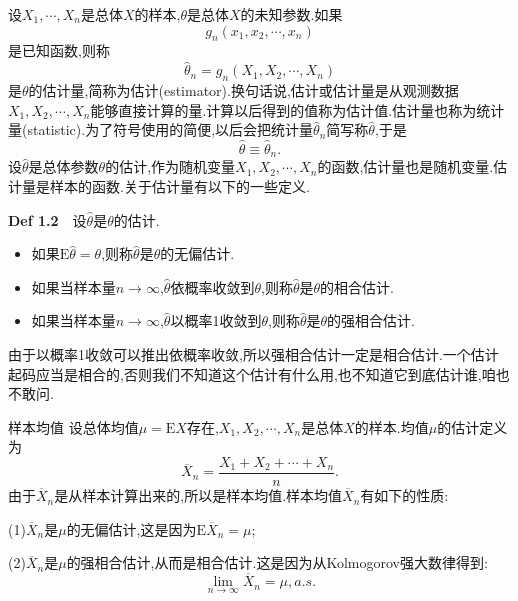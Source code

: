 	\begin{frame}
		设$X_1,\cdots,X_n$是总体$X$的样本,$\theta$是总体$X$的未知参数.如果
		\begin{equation}
			g_n(x_1,x_2,\cdots,x_n)
		\end{equation}
		是已知函数,则称
		\begin{equation}
			\widehat{\theta}_n = g_n(X_1,X_2,\cdots,X_n)
		\end{equation}
		是$\theta$的\alert{估计量},简称为\alert{估计}(estimator).换句话说,估计或估计量是从观测数据$X_1,X_2,\cdots,X_n$能够直接计算的量.计算以后得到的值称为\alert{估计值}.估计量也称为\alert{统计量}(statistic).为了符号使用的简便,以后会把统计量$\widehat{\theta}_n$简写称$\widehat{\theta}$,于是
		\begin{equation}
			\widehat{\theta} \equiv \widehat{\theta}_n.
		\end{equation}
		设$\widehat{\theta}$是总体参数$\theta$的估计,作为随机变量$X_1,X_2,\cdots,X_n$的函数,估计量也是随机变量.估计量是样本的函数.关于估计量有以下的一些定义.

	\end{frame}

	\begin{frame}
		\begin{block}{\textbf{Def 1.2}$\quad$设$\widehat{\theta}$是$\theta$的估计.}
			\begin{itemize}
				\item 如果$\mathrm{E}\widehat{\theta} = \theta$,则称$\widehat{\theta}$是$\theta$的\alert{无偏估计}.
				\item 如果当样本量$n\to\infty$,$\widehat{\theta}$依概率收敛到$\theta$,则称$\widehat{\theta}$是$\theta$的\alert{相合估计}.
				\item 如果当样本量$n\to\infty$,$\widehat{\theta}$以概率1收敛到$\theta$,则称$\widehat{\theta}$是$\theta$的\alert{强相合估计}.
			\end{itemize}
		\end{block}
		由于以概率1收敛可以推出依概率收敛,所以强相合估计一定是相合估计.一个估计起码应当是相合的,否则我们不知道这个估计有什么用,也不知道它到底估计谁,咱也不敢问.
	\end{frame}

	\begin{frame}{样本均值}
		设总体均值$\mu = \mathrm{E}X$存在,$X_1,X_2,\cdots,X_n$是总体$X$的样本.均值$\mu$的估计定义为
		\begin{equation}
			\overline{X}_n = \frac{X_1+X_2+\cdots+X_n}{n}.
		\end{equation}
		由于$\overline{X}_n$是从样本计算出来的,所以是样本均值.样本均值$\overline{X}_n$有如下的性质:
		
		(1)$\overline{X}_n$是$\mu$的无偏估计,这是因为$\mathrm{E}\overline{X}_n = \mu$;
		
		(2)$\overline{X}_n$是$\mu$的强相合估计,从而是相合估计.这是因为从Kolmogorov强大数律得到:
		\begin{equation}
			\lim\limits_{n\to\infty}\overline{X}_n = \mu,a.s.
		\end{equation}
		
	\end{frame}

